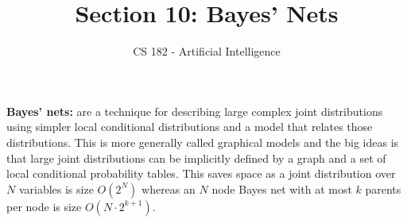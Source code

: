 \documentclass[11pt]{article}
\title{Section 10: Bayes' Nets}
\date{}
\author{CS 182 - Artificial Intelligence}
\begin{document}
\maketitle


\renewcommand{\labelenumii}{\arabic{enumii}.}
\setlength{\parindent}{0pt}

\textbf{Bayes' nets:} are a technique for describing large complex joint distributions using simpler local conditional distributions and a model that relates those distributions. This is more generally called graphical models and the big ideas is that large joint distributions can be implicitly defined by a graph and a set of local conditional probability tables. This saves space as a joint distribution over $N$ variables is size $O(2^N)$ whereas an $N$ node Bayes net with at most $k$ parents per node is size $O(N \cdot 2^{k+1})$.
\end{document}
